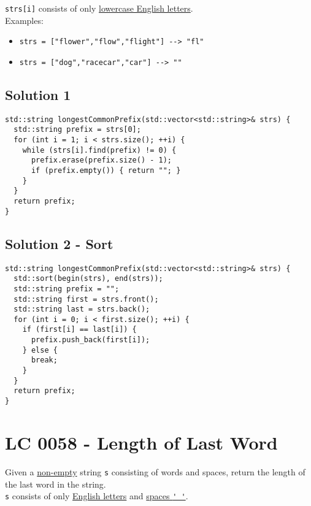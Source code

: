 {\colorbox{CodeBackground}{\lstinline|strs[i]|}} consists of only \ul{lowercase English letters}.\\

Examples:
\begin{itemize}
\item {\colorbox{CodeBackground}{\lstinline|strs = ["flower","flow","flight"] --> "fl"|}}
\item {\colorbox{CodeBackground}{\lstinline|strs = ["dog","racecar","car"] --> ""|}}
\end{itemize}

\subsection*{Solution 1}
\begin{lstlisting}
std::string longestCommonPrefix(std::vector<std::string>& strs) {
  std::string prefix = strs[0];
  for (int i = 1; i < strs.size(); ++i) {
    while (strs[i].find(prefix) != 0) {
      prefix.erase(prefix.size() - 1);
      if (prefix.empty()) { return ""; }
    }
  }
  return prefix;
}
\end{lstlisting}

\subsection*{Solution 2 - Sort}
\begin{lstlisting}
std::string longestCommonPrefix(std::vector<std::string>& strs) {
  std::sort(begin(strs), end(strs));
  std::string prefix = "";
  std::string first = strs.front();
  std::string last = strs.back();
  for (int i = 0; i < first.size(); ++i) {
    if (first[i] == last[i]) {
      prefix.push_back(first[i]);
    } else {
      break;
    }
  }
  return prefix;
}
\end{lstlisting}

\section{LC 0058 - Length of Last Word}\label{lc0058}
Given a \ul{non-empty} string {\colorbox{CodeBackground}{\lstinline|s|}} consisting of words and spaces, return the length of the last word in the string.\\

{\colorbox{CodeBackground}{\lstinline|s|}} consists of only \ul{English letters} and \ul{spaces {\colorbox{CodeBackground}{\lstinline|' '|}}}.\\

